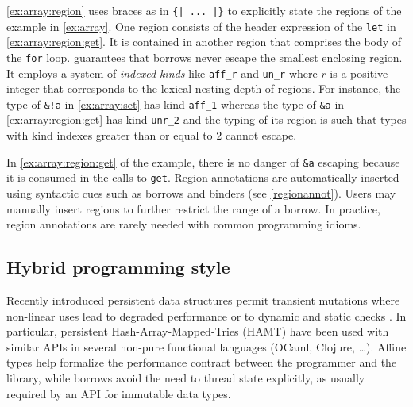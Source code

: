 \cref{ex:array:region} uses braces as in \lstinline/{| ... |}/ to
explicitly state the regions of the example in \cref{ex:array}.  One
region consists of the header expression of the \lstinline/let/ in
\cref{ex:array:region:get}. It is contained in another region that
comprises the body of the \lstinline/for/ loop. \lang guarantees that borrows 
never escape the smallest enclosing region. It employs a system of
\emph{indexed kinds} like \lstinline{aff_r} and \lstinline{un_r} where
$r$ is a positive integer that corresponds to the lexical nesting
depth of regions. For instance, the type of \lstinline{&!a} in
\cref{ex:array:set} has kind \lstinline{aff_1} whereas the type of
\lstinline{&a} in \cref{ex:array:region:get} has kind
\lstinline{unr_2} and the typing of its region is such that types with
kind indexes greater than or equal to $2$ cannot escape. 

In \cref{ex:array:region:get} of the example, there is no danger of \lstinline/&a/ escaping because it
is consumed in the calls to \lstinline/get/.
Region annotations are automatically inserted using
syntactic cues such as borrows and binders (see 
\cref{regionannot}).  Users may manually insert regions to further restrict the range of a
borrow. In practice, region annotations are
rarely needed with common programming idioms.






\subsection{Hybrid programming style}

Recently introduced persistent data structures
permit transient mutations where
non-linear uses lead to degraded performance
\cite{DBLP:conf/ml/ConchonF07} or to
dynamic and static checks \cite{DBLP:journals/pacmpl/Puente17}.
In particular, persistent Hash-Array-Mapped-Tries (HAMT) have been used with similar
APIs in several non-pure functional languages (OCaml, Clojure, \dots).
Affine types help formalize the performance contract between the programmer
and the library, while borrows avoid the need to thread state explicitly,
as usually required by an API for immutable data types.
%

